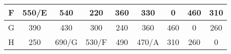 \documentclass[12pt]{article}
\begin{document}
\begin{enumerate}
\begin{tabular}{|c|c|c|c|c|c|c|c|c|}
F    & {\color[HTML]{333333} 550/E} & {\color[HTML]{333333} 540}   & {\color[HTML]{333333} 220}   & {\color[HTML]{333333} 360}   & {\color[HTML]{333333} 330}   & {\color[HTML]{333333} 0}     & {\color[HTML]{333333} 460} & {\color[HTML]{333333} 310}   \\ \hline
G    & {\color[HTML]{333333} 390}   & {\color[HTML]{333333} 430}   & {\color[HTML]{333333} 300}   & {\color[HTML]{333333} 240}   & {\color[HTML]{333333} 360}   & {\color[HTML]{333333} 460}   & {\color[HTML]{333333} 0}   & {\color[HTML]{333333} 260}   \\ \hline
H    & {\color[HTML]{333333} 250}   & {\color[HTML]{333333} 690/G} & {\color[HTML]{333333} 530/F} & {\color[HTML]{333333} 490}   & {\color[HTML]{333333} 470/A} & {\color[HTML]{333333} 310}   & {\color[HTML]{333333} 260} & {\color[HTML]{333333} 0}     \\ \hline
\end{tabular}

\newpage


\end{enumerate}
\end{document}
